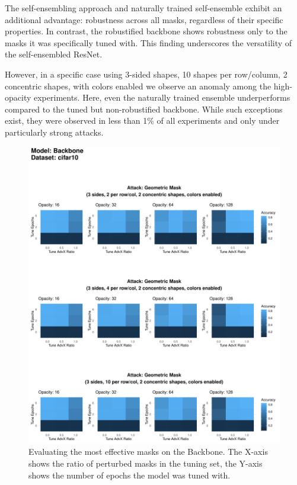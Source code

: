 \documentclass[a4paper, oneside]{discothesis}
\begin{document}
The self-ensembling approach and naturally trained self-ensemble exhibit an additional advantage: robustness across all masks, regardless of their specific properties. In contrast, the robustified backbone shows robustness only to the masks it was specifically tuned with. This finding underscores the versatility of the self-ensembled ResNet.

However, in a specific case \textendash{} using 3-sided shapes, 10 shapes per row/column, 2 concentric shapes, with colors enabled \textendash{} we observe an anomaly among the high-opacity experiments. Here, even the naturally trained ensemble underperforms compared to the tuned but non-robustified backbone. While such exceptions exist, they were observed in less than 1\% of all experiments and only under particularly strong attacks.

\begin{figure}
	\centering
	\includegraphics[width=\textwidth,height=\textheight,keepaspectratio]{figures/baseline_cifar10.pdf}
	\caption{Evaluating the most effective masks on the Backbone. The X-axis shows the ratio of perturbed masks in the tuning set, the Y-axis shows the number of epochs the model was tuned with.}
	\label{fig:vanilla}
\end{figure}
\end{document}
